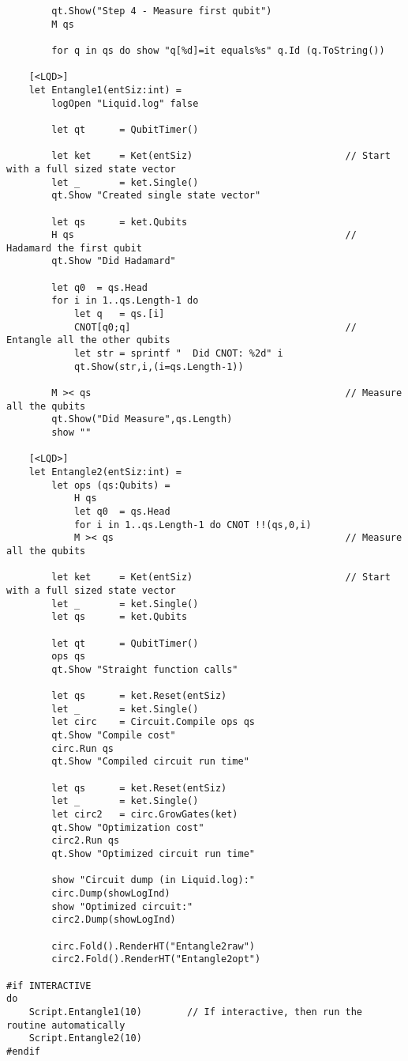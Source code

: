 \documentclass{article}
\theoremstyle{plain}
\theoremstyle{definition}
\theoremstyle{remark}
\begin{document}
\begin{verbatim}
        qt.Show("Step 4 - Measure first qubit")
        M qs

        for q in qs do show "q[%d]=it equals%s" q.Id (q.ToString())

    [<LQD>]
    let Entangle1(entSiz:int) =
        logOpen "Liquid.log" false

        let qt      = QubitTimer()

        let ket     = Ket(entSiz)                           // Start with a full sized state vector
        let _       = ket.Single()
        qt.Show "Created single state vector"

        let qs      = ket.Qubits
        H qs                                                // Hadamard the first qubit
        qt.Show "Did Hadamard"

        let q0  = qs.Head
        for i in 1..qs.Length-1 do
            let q   = qs.[i]
            CNOT[q0;q]                                      // Entangle all the other qubits
            let str = sprintf "  Did CNOT: %2d" i
            qt.Show(str,i,(i=qs.Length-1))

        M >< qs                                             // Measure all the qubits
        qt.Show("Did Measure",qs.Length)
        show ""

    [<LQD>]
    let Entangle2(entSiz:int) =
        let ops (qs:Qubits) =
            H qs
            let q0  = qs.Head
            for i in 1..qs.Length-1 do CNOT !!(qs,0,i)
            M >< qs                                         // Measure all the qubits

        let ket     = Ket(entSiz)                           // Start with a full sized state vector
        let _       = ket.Single()
        let qs      = ket.Qubits

        let qt      = QubitTimer()
        ops qs
        qt.Show "Straight function calls"

        let qs      = ket.Reset(entSiz)
        let _       = ket.Single()
        let circ    = Circuit.Compile ops qs
        qt.Show "Compile cost"
        circ.Run qs
        qt.Show "Compiled circuit run time"

        let qs      = ket.Reset(entSiz)
        let _       = ket.Single()
        let circ2   = circ.GrowGates(ket)
        qt.Show "Optimization cost"
        circ2.Run qs
        qt.Show "Optimized circuit run time"

        show "Circuit dump (in Liquid.log):"
        circ.Dump(showLogInd)
        show "Optimized circuit:"
        circ2.Dump(showLogInd)

        circ.Fold().RenderHT("Entangle2raw")
        circ2.Fold().RenderHT("Entangle2opt")

#if INTERACTIVE
do
    Script.Entangle1(10)        // If interactive, then run the routine automatically
    Script.Entangle2(10)
#endif

\end{verbatim}
\end{document}
